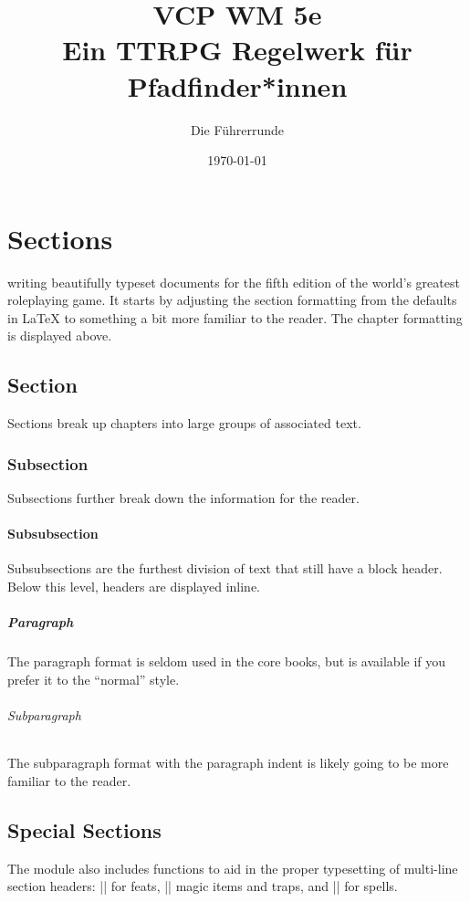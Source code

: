 \documentclass[letterpaper,twocolumn,openany,nodeprecatedcode]{dndbook}
\title{VCP WM 5e \\
\large Ein TTRPG Regelwerk für Pfadfinder*innen}
\author{Die Führerrunde}
\date{\today}
\begin{document}
\frontmatter

\maketitle

\tableofcontents

\mainmatter%

\chapter{Sections}

 writing beautifully typeset documents for the fifth edition of the world's greatest roleplaying game. It starts by adjusting the section formatting from the defaults in \LaTeX{} to something a bit more familiar to the reader. The chapter formatting is displayed above.

\section{Section}
Sections break up chapters into large groups of associated text.

\subsection{Subsection}
Subsections further break down the information for the reader.

\subsubsection{Subsubsection}
Subsubsections are the furthest division of text that still have a block header. Below this level, headers are displayed inline.

\paragraph{Paragraph}
The paragraph format is seldom used in the core books, but is available if you prefer it to the ``normal'' style.

\subparagraph{Subparagraph}
The subparagraph format with the paragraph indent is likely going to be more familiar to the reader.

\section{Special Sections}
The module also includes functions to aid in the proper typesetting of multi-line section headers: |\DndFeatHeader| for feats, |\DndItemHeader| magic items and traps, and |\DndSpellHeader| for spells.
\end{document}
